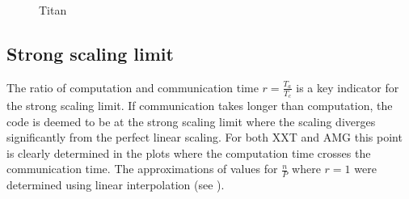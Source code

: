 \documentclass{sig-alternate}
\begin{document}
\begin{figure}
{  }
\caption{Titan}
\label{fig:scaling_titan}
\end{figure}




\subsection{Strong scaling limit}

The ratio of computation and communication time $r=\frac{T_a}{T_c}$ is a key
indicator for the strong scaling limit. If communication takes longer than
computation, the code is deemed to be at the strong scaling limit where the
scaling diverges significantly from the perfect linear scaling. For both XXT and
AMG this point is clearly determined in the plots where the computation time
crosses the communication time. The approximations of values for $\frac{n}{P}$ where
$r=1$ were determined using linear interpolation (see ).
\end{document}
